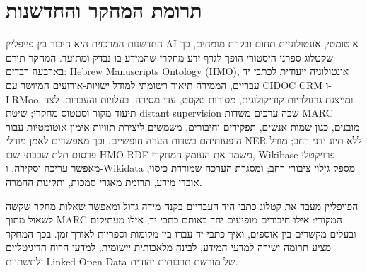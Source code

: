 \documentclass[10pt,a4paper]{article}
\begin{document}
\section*{תרומת המחקר והחדשנות}
החדשנות המרכזית היא חיבור בין פייפליין \textenglish{AI} אוטומטי, אונטולוגיית תחום ובקרת מומחים, כך שקטלוג ספרני היסטורי הופך לגרף ידע מחקרי שהמידע בו נבדק ומתועד. המחקר תורם בארבעה רבדים: \textenglish{Hebrew Manuscripts Ontology (HMO)}, אונטולוגיה ייעודית לכתבי יד עבריים, הממירה תיאור רשומתי למודל ישויות-אירועים המיושר עם \textenglish{CIDOC CRM} ו-\textenglish{LRMoo}, ומייצגת גרנולריות קודיקולוגית, מסורות טקסט, עדי מסירה, בעלויות והעברות, לצד תיעוד מקור וסטטוס מחקרי; שיטת \textenglish{distant supervision} שבה ערכים משדות \textenglish{MARC} מובנים, כגון שמות אנשים, תפקידים וחיבורים, משמשים ליצירת תוויות אימון אוטומטיות עבור הופעותיהם בשדות הערה חופשיים, וכך מאפשרים לאמן מודלי \textenglish{NER} ללא תיוג ידני רחב; מודל פרסום תלת-שכבתי שבו \textenglish{HMO RDF} משמר את העומק המחקרי, \textenglish{Wikibase} פרויקטלי מאפשר עריכה וסקירה, ו-\textenglish{Wikidata} מספק גילוי ציבורי רחב; ומסגרת הערכה שמודדת כיסוי, אובדן מידע, תרומת מאגרי סמכות, ותקינות ההמרה.

הפייפליין מעבד את קטלוג כתבי היד העבריים בקנה מידה גדול ומאפשר שאלות מחקר שקשה לשאול מתוך \textenglish{MARC} המקורי: אילו חיבורים מופיעים יחד באותם כתבי יד, אילו מעתיקים ובעלים מקשרים בין אוספים, ואיך כתבי יד עברו בין מקומות וספריות לאורך זמן. בכך המחקר מציע תרומה ישירה למדעי המידע, לבינה מלאכותית יישומית, למדעי הרוח הדיגיטליים ולתשתיות \textenglish{Linked Open Data} של מורשת תרבותית יהודית.
\end{document}
